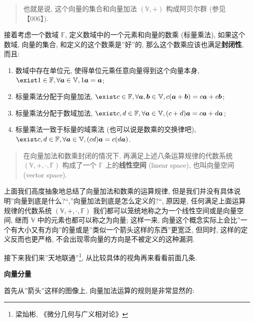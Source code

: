 \begin{quote}
也就是说, 这个向量的集合和向量加法 \((\mathbb{V},+)\) 构成阿贝尔群
(参见【006】).
\end{quote}

接着考虑一个数域 \(\mathbb{F}\), 定义数域中的一个元素和向量的数乘
(标量乘法), 如果这个数域, 向量的集合, 和定义的这个数乘是''好''的,
那么这个数乘应该也满足\textbf{封闭性}, 而且:

\begin{enumerate}
\def\labelenumi{\arabic{enumi}.}
\setcounter{enumi}{4}
\tightlist
\item
  数域中存在单位元, 使得单位元乘任意向量得到这个向量本身,
  \(\exist 1\in\mathbb{F},\forall\boldsymbol{a}\in\mathbb{V},1\boldsymbol{a}=\boldsymbol{a}\);
\item
  标量乘法分配于向量加法,
  \(\exist c\in\mathbb{F},\forall\boldsymbol{a},\boldsymbol{b}\in\mathbb{V},c(\boldsymbol{a}+\boldsymbol{b})=c\boldsymbol{a}+c\boldsymbol{b}\);
\item
  标量乘法分配于数域加法,
  \(\exist c,d\in\mathbb{F},\forall\boldsymbol{a}\in\mathbb{V},(c+d)\boldsymbol{a}=c\boldsymbol{a}+d\boldsymbol{a}\);
\item
  标量乘法一致于标量的域乘法 (也可以说是数乘的交换律吧),
  \(\exist c,d\in\mathbb{F},\forall\boldsymbol{a}\in\mathbb{V},(cd)\boldsymbol{a}=c(d\boldsymbol{a})\).
\end{enumerate}

\begin{quote}
在向量加法和数乘封闭的情况下, 再满足上述八条运算规律的代数系统
\((\mathbb{V},+,\cdot,\mathbb{F})\) 构成了一个 \(\mathbb{F}\)
上的\textbf{线性空间} (linear space), 也叫向量空间 (vector space).
\end{quote}

上面我们高度抽象地总结了向量加法和数乘的运算规律,
但是我们并没有具体说明''向量到底是什么?``,''向量加法到底是怎么定义的?``,
原因是, 任何满足上面运算规律的代数系统
\((\mathbb{V},+,\cdot,\mathbb{F})\)
我们都可以笼统地称之为一个线性空间或是向量空间, 继而 \(\mathbb{V}\)
中的元素也都可以称之为向量; 这样一来,
向量这个概念实际上会比''一个有大小又有方向''的量或是''类似一个箭头这样的东西''更宽泛,
但同时, 这样的定义反而也更严格,
不会出现零向量的方向是不被定义的这种漏洞.

接下来我们来''天地联通''\footnote{梁灿彬, 《微分几何与广义相对论》},
从比较具体的视角再来看看前面几条.

\textbf{向量分量}

首先从''箭头''这样的图像上, 向量加法运算的规则是非常显然的:


